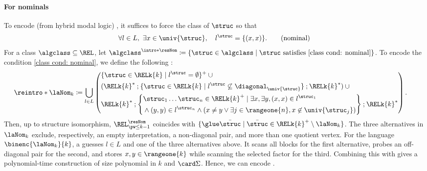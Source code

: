 \documentclass[10pt,a4paper]{article}
\theoremstyle{definition}
\theoremstyle{remark}
\DeclarePairedDelimiter\set{\{}{\}}
\DeclarePairedDelimiter\tuple{(}{)}
\newcommand{\defeq}{\coloneq}
\newcommand{\mul}[1]{\bar{#1}}
\newcommand{\compo}{\mathbin{;}}
\newcommand{\vsig}{\Sigma}
\begin{document}
\paragraph*{For nominals}
To encode \intro*{} (from hybrid modal logic) \cite{arecesHybridLogics2007}, it suffices to force the class of  $\struc$
so that
\begin{align*}
\forall l \in L,\ \exists x \in \univ{\struc},\quad
l^{\struc} = \set{(x,x)}. \tag{nominal}\label{class cond: nominal}
\end{align*}
\AP
For a class $\algclass \subseteq \REL$,
let $\algclass^{\intro*\resNom} \defeq \set{\struc \in \algclass \mid \text{$\struc$ satisfies \eqref{class cond: nominal}}}$.
To encode the condition \eqref{class cond: nominal}, we define the following :
\AP
{}
\begin{align*}
    \reintro*\laNom_{k} &\defeq
    \bigcup_{l \in L}
    \left(\begin{aligned}
       & \set{\struc \in \RELk{k} \mid l^{\struc} = \emptyset}^{+} \cup {} \\
       & (\RELk{k}^{*} \compo \set{\struc \in \RELk{k} \mid l^{\struc} \not\subseteq \diagonal_{\univ{\struc}}} \compo \RELk{k}^{*}) \cup {} \\
       & \RELk{k}^{*} \compo \set*{
            \begin{aligned}
                &\struc_1 \dots \struc_{n} \in \RELk{k}^{+} \mid \exists x, \exists y, \tuple{x, x} \in l^{\struc_1}   \\
                &{} \land \tuple{y, y} \in l^{\struc_n} \land  (x \neq y \lor \exists j \in \rangeone{n}, x \not\in \univ{\struc_{j}})
            \end{aligned}} \compo \RELk{k}^{*}
    \end{aligned}\right).
\end{align*}
Then, up to structure isomorphism, $\REL^{\resNom}_{\pw \le k-1}$ coincides with
$\set{\glue \mul{\struc} \mid \mul{\struc} \in \RELk{k}^{+} \setminus \laNom_{k}}$.
The three alternatives in $\laNom_k$ exclude, respectively, an empty interpretation, a non-diagonal pair, and more than one quotient vertex.
For the language $\binenc{\laNom_{k}}{k}$,
a  guesses $l\in L$ and one of the three alternatives above.
It scans all blocks for the first alternative, probes an off-diagonal pair for the second,
and stores $x,y\in\rangeone{k}$ while scanning the selected factor for the third.
Combining this with  gives a polynomial-time construction
of size polynomial in $k$ and $\card\vsig$.
Hence, we can encode .
\end{document}
